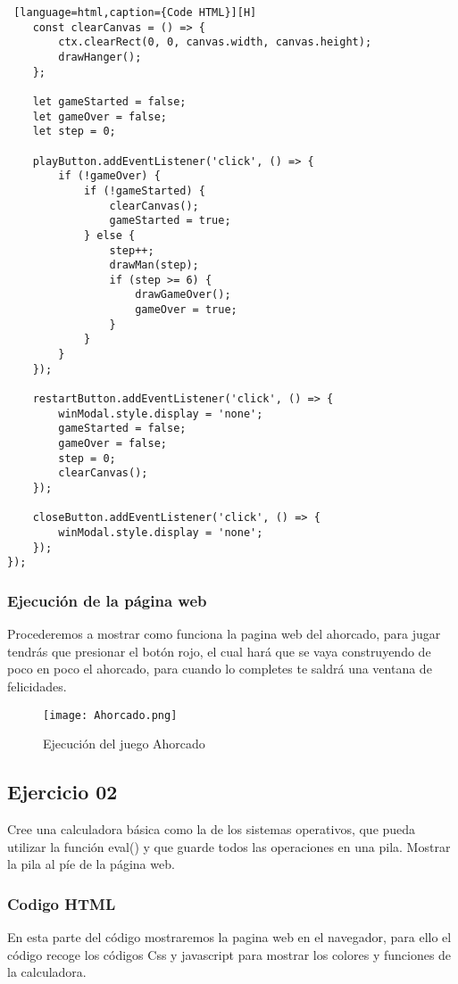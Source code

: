 \documentclass[14pt]{article}
\begin{document}
\begin{lstlisting} [language=html,caption={Code HTML}][H]
    const clearCanvas = () => {
        ctx.clearRect(0, 0, canvas.width, canvas.height);
        drawHanger();
    };

    let gameStarted = false;
    let gameOver = false;
    let step = 0;

    playButton.addEventListener('click', () => {
        if (!gameOver) {
            if (!gameStarted) {
                clearCanvas();
                gameStarted = true;
            } else {
                step++;
                drawMan(step);
                if (step >= 6) {
                    drawGameOver();
                    gameOver = true;
                }
            }
        }
    });

    restartButton.addEventListener('click', () => {
        winModal.style.display = 'none';
        gameStarted = false;
        gameOver = false;
        step = 0;
        clearCanvas();
    });

    closeButton.addEventListener('click', () => {
        winModal.style.display = 'none';
    });
});
    \end{lstlisting}
    \vspace{100pt}
    \subsubsection{Ejecución de la página web}
    Procederemos a mostrar como funciona la pagina web del ahorcado, para jugar tendrás que presionar el botón rojo, el cual hará que se vaya construyendo de poco en poco el ahorcado, para cuando lo completes te saldrá una ventana de felicidades.


    \begin{figure}[H]
    \centering
    \texttt{[image: Ahorcado.png]}
    \caption{Ejecución del juego Ahorcado} %
    \label{fig:imagen} 
    \end{figure}

    \subsection{Ejercicio 02}
    Cree una calculadora básica como la de los sistemas operativos, que pueda utilizar la función eval() y que guarde todos las operaciones en una pila. Mostrar la pila al píe de la página web. 

    \subsubsection{Codigo HTML}
    En esta parte del código mostraremos la pagina web en el navegador, para ello el código recoge los códigos Css y javascript para mostrar los colores y funciones de la calculadora.
    
\end{document}

